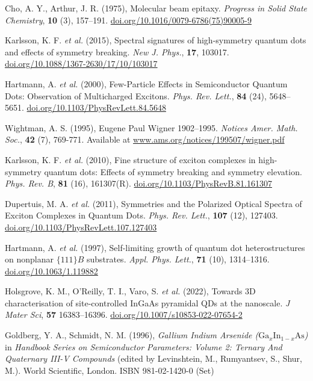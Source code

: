 \documentclass[12pt]{article}
\numberwithin{equation}{section}
\begin{document}
\begin{thebibliography}{10}
Cho, A. Y., Arthur, J. R. (1975), Molecular beam epitaxy. \textit{Progress in Solid State Chemistry}, \textbf{10} (3), 157--191. \href{https://doi.org/10.1016/0079-6786(75)90005-9}{doi.org/10.1016/0079-6786(75)90005-9}

Karlsson, K. F. \textit{et al.} (2015), Spectral signatures of high-symmetry quantum dots and effects of symmetry breaking. \textit{New J. Phys.}, \textbf{17}, 103017. \href{https://doi.org/10.1088/1367-2630/17/10/103017}{doi.org/10.1088/1367-2630/17/10/103017}

Hartmann, A. \textit{et al.} (2000), Few-Particle Effects in Semiconductor Quantum Dots: Observation of Multicharged Excitons. \textit{Phys. Rev. Lett.}, \textbf{84} (24), 5648--5651. \href{https://doi.org/10.1103/PhysRevLett.84.5648}{doi.org/10.1103/PhysRevLett.84.5648}

Wightman, A. S. (1995), Eugene Paul Wigner 1902--1995. \textit{Notices Amer. Math. Soc.}, \textbf{42} (7), 769-771. Available at \href{https://www.ams.org/notices/199507/wigner.pdf}{www.ams.org/notices/199507/wigner.pdf}

Karlsson, K. F. \textit{et al.} (2010), Fine structure of exciton complexes in high-symmetry quantum dots: Effects of symmetry breaking and symmetry elevation. \textit{Phys. Rev. B}, \textbf{81} (16), 161307(R). \href{https://doi.org/10.1103/PhysRevB.81.161307}{doi.org/10.1103/PhysRevB.81.161307}

Dupertuis, M. A. \textit{et al.} (2011), Symmetries and the Polarized Optical Spectra of Exciton Complexes in Quantum Dots. \textit{Phys. Rev. Lett.}, \textbf{107} (12), 127403. \href{https://doi.org/10.1103/PhysRevLett.107.127403}{doi.org/10.1103/PhysRevLett.107.127403}

Hartmann, A. \textit{et al.} (1997), Self-limiting growth of quantum dot heterostructures on nonplanar $\{111\}B$ substrates. \textit{Appl. Phys. Lett.}, \textbf{71} (10), 1314--1316. \href{https://doi.org/10.1063/1.119882}{doi.org/10.1063/1.119882}

Holsgrove, K. M., O'Reilly, T. I., Varo, S. \textit{et al.} (2022), Towards 3D characterisation of site-controlled InGaAs pyramidal QDs at the nanoscale. \textit{J Mater Sci}, \textbf{57} 16383--16396. \href{https://doi.org/10.1007/s10853-022-07654-2}{doi.org/10.1007/s10853-022-07654-2}

Goldberg, Y. A., Schmidt, N. M. (1996), \textit{Gallium Indium Arsenide ($\text{Ga}_{x}\text{In}_{1-x}\text{As}$)} in \textit{Handbook Series on Semiconductor Parameters: Volume 2: Ternary And Quaternary III-V Compounds} (edited by Levinshtein, M., Rumyantsev, S., Shur, M.). World Scientific, London. ISBN  981-02-1420-0 (Set)


\end{thebibliography}
\end{document}
